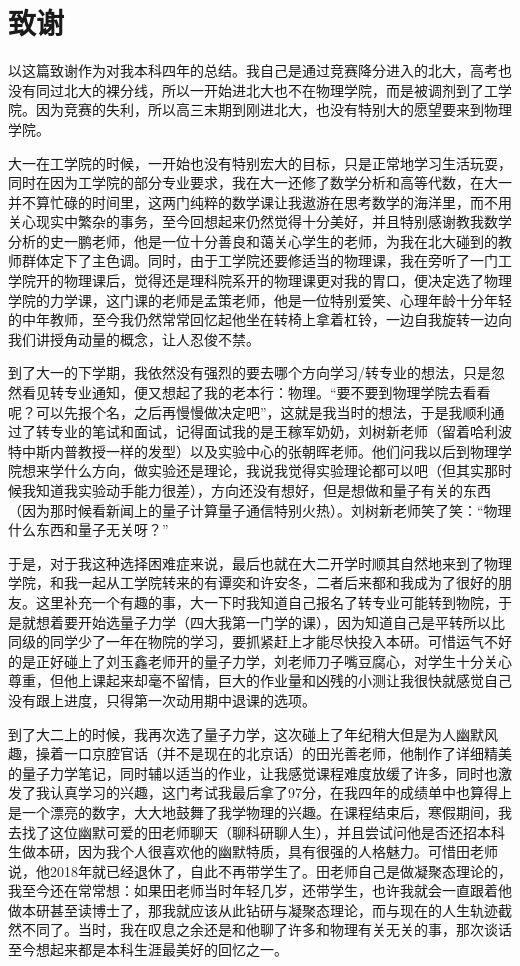 \chapter{致谢}

以这篇致谢作为对我本科四年的总结。我自己是通过竞赛降分进入的北大，高考也没有同过北大的裸分线，所以一开始进北大也不在物理学院，而是被调剂到了工学院。因为竞赛的失利，所以高三末期到刚进北大，也没有特别大的愿望要来到物理学院。

大一在工学院的时候，一开始也没有特别宏大的目标，只是正常地学习生活玩耍，同时在因为工学院的部分专业要求，我在大一还修了数学分析和高等代数，在大一并不算忙碌的时间里，这两门纯粹的数学课让我遨游在思考数学的海洋里，而不用关心现实中繁杂的事务，至今回想起来仍然觉得十分美好，并且特别感谢教我数学分析的史一鹏老师，他是一位十分善良和蔼关心学生的老师，为我在北大碰到的教师群体定下了主色调。同时，由于工学院还要修适当的物理课，我在旁听了一门工学院开的物理课后，觉得还是理科院系开的物理课更对我的胃口，便决定选了物理学院的力学课，这门课的老师是孟策老师，他是一位特别爱笑、心理年龄十分年轻的中年教师，至今我仍然常常回忆起他坐在转椅上拿着杠铃，一边自我旋转一边向我们讲授角动量的概念，让人忍俊不禁。

到了大一的下学期，我依然没有强烈的要去哪个方向学习/转专业的想法，只是忽然看见转专业通知，便又想起了我的老本行：物理。“要不要到物理学院去看看呢？可以先报个名，之后再慢慢做决定吧”，这就是我当时的想法，于是我顺利通过了转专业的笔试和面试，记得面试我的是王稼军奶奶，刘树新老师（留着哈利波特中斯内普教授一样的发型）以及实验中心的张朝晖老师。他们问我以后到物理学院想来学什么方向，做实验还是理论，我说我觉得实验理论都可以吧（但其实那时候我知道我实验动手能力很差），方向还没有想好，但是想做和量子有关的东西（因为那时候看新闻上的量子计算量子通信特别火热）。刘树新老师笑了笑：“物理什么东西和量子无关呀？”

于是，对于我这种选择困难症来说，最后也就在大二开学时顺其自然地来到了物理学院，和我一起从工学院转来的有谭奕和许安冬，二者后来都和我成为了很好的朋友。这里补充一个有趣的事，大一下时我知道自己报名了转专业可能转到物院，于是就想着要开始选量子力学（四大我第一门学的课），因为知道自己是平转所以比同级的同学少了一年在物院的学习，要抓紧赶上才能尽快投入本研。可惜运气不好的是正好碰上了刘玉鑫老师开的量子力学，刘老师刀子嘴豆腐心，对学生十分关心尊重，但他上课起来却毫不留情，巨大的作业量和凶残的小测让我很快就感觉自己没有跟上进度，只得第一次动用期中退课的选项。

到了大二上的时候，我再次选了量子力学，这次碰上了年纪稍大但是为人幽默风趣，操着一口京腔官话（并不是现在的北京话）的田光善老师，他制作了详细精美的量子力学笔记，同时辅以适当的作业，让我感觉课程难度放缓了许多，同时也激发了我认真学习的兴趣，这门考试我最后拿了97分，在我四年的成绩单中也算得上是一个漂亮的数字，大大地鼓舞了我学物理的兴趣。在课程结束后，寒假期间，我去找了这位幽默可爱的田老师聊天（聊科研聊人生），并且尝试问他是否还招本科生做本研，因为我个人很喜欢他的幽默特质，具有很强的人格魅力。可惜田老师说，他2018年就已经退休了，自此不再带学生了。田老师自己是做凝聚态理论的，我至今还在常常想：如果田老师当时年轻几岁，还带学生，也许我就会一直跟着他做本研甚至读博士了，那我就应该从此钻研与凝聚态理论，而与现在的人生轨迹截然不同了。当时，我在叹息之余还是和他聊了许多和物理有关无关的事，那次谈话至今想起来都是本科生涯最美好的回忆之一。

